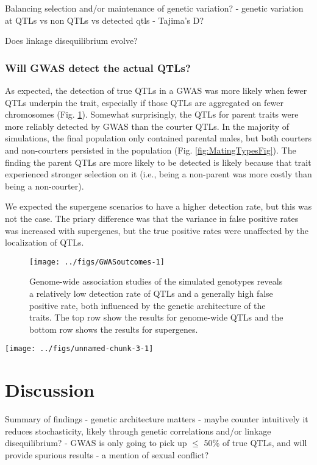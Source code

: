 \documentclass[
  11pt,
]{article}
\begin{document}
Balancing selection and/or maintenance of genetic variation? - genetic
variation at QTLs vs non QTLs vs detected qtls - Tajima's D?

Does linkage disequilibrium evolve?

\hypertarget{will-gwas-detect-the-actual-qtls}{%
\subsubsection{Will GWAS detect the actual QTLs?}\label{will-gwas-detect-the-actual-qtls}}

As expected, the detection of true QTLs in a GWAS was more likely when
fewer QTLs underpin the trait, especially if those QTLs are aggregated
on fewer chromosomes (Fig. \ref{fig:GWASoutcomes}). Somewhat
surprisingly, the QTLs for parent traits were more reliably detected by
GWAS than the courter QTLs. In the majority of simulations, the final
population only contained parental males, but both courters and
non-courters persisted in the population (Fig.
\ref{fig:MatingTypesFig}). The finding the parent QTLs are more likely
to be detected is likely because that trait experienced stronger
selection on it (i.e., being a non-parent was more costly than being a
non-courter).

We expected the supergene scenarios to have a higher detection rate, but
this was not the case. The priary difference was that the variance in
false positive rates was increased with supergenes, but the true
positive rates were unaffected by the localization of QTLs.

\begin{figure}[H]
\texttt{[image: ../figs/GWASoutcomes-1]} \caption{Genome-wide association studies of the simulated genotypes reveals a relatively low detection rate of QTLs and a generally high false positive rate, both influenced by the genetic architecture of the traits. The top row show the results for genome-wide QTLs and the bottom row shows the results for supergenes.}\label{fig:GWASoutcomes}
\end{figure}

\texttt{[image: ../figs/unnamed-chunk-3-1]}

\hypertarget{discussion}{%
\section{Discussion}\label{discussion}}

Summary of findings - genetic architecture matters - maybe counter
intuitively it reduces stochasticity, likely through genetic
correlations and/or linkage disequilibrium? - GWAS is only going to pick
up \(\le\) 50\% of true QTLs, and will provide spurious results - a mention
of sexual conflict?
\end{document}
